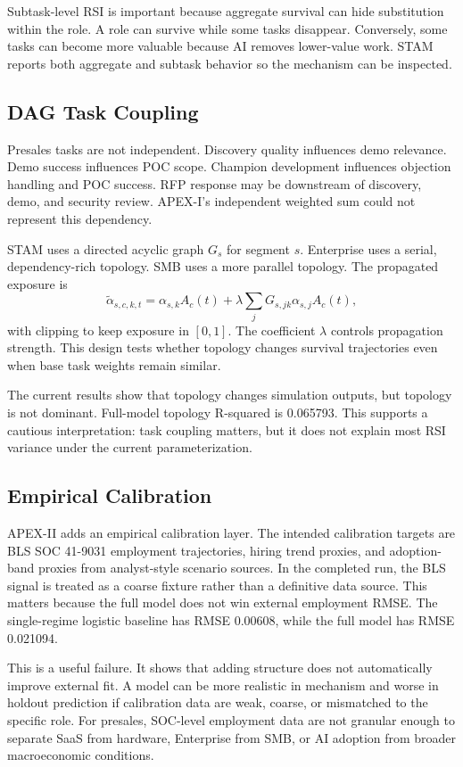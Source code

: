 \documentclass[10pt,conference]{IEEEtran}
\begin{document}
Subtask-level RSI is important because aggregate survival can hide substitution within the role. A role can survive while some tasks disappear. Conversely, some tasks can become more valuable because AI removes lower-value work. STAM reports both aggregate and subtask behavior so the mechanism can be inspected.

\subsection{DAG Task Coupling}
Presales tasks are not independent. Discovery quality influences demo relevance. Demo success influences POC scope. Champion development influences objection handling and POC success. RFP response may be downstream of discovery, demo, and security review. APEX-I's independent weighted sum could not represent this dependency.

STAM uses a directed acyclic graph $G_s$ for segment $s$. Enterprise uses a serial, dependency-rich topology. SMB uses a more parallel topology. The propagated exposure is
\begin{equation}
\tilde{\alpha}_{s,c,k,t} =
\alpha_{s,k} A_c(t) + \lambda \sum_j G_{s,jk}\alpha_{s,j} A_c(t),
\end{equation}
with clipping to keep exposure in $[0,1]$. The coefficient $\lambda$ controls propagation strength. This design tests whether topology changes survival trajectories even when base task weights remain similar.

The current results show that topology changes simulation outputs, but topology is not dominant. Full-model topology R-squared is 0.065793. This supports a cautious interpretation: task coupling matters, but it does not explain most RSI variance under the current parameterization.

\subsection{Empirical Calibration}
APEX-II adds an empirical calibration layer. The intended calibration targets are BLS SOC 41-9031 employment trajectories, hiring trend proxies, and adoption-band proxies from analyst-style scenario sources. In the completed run, the BLS signal is treated as a coarse fixture rather than a definitive data source. This matters because the full model does not win external employment RMSE. The single-regime logistic baseline has RMSE 0.00608, while the full model has RMSE 0.021094.

This is a useful failure. It shows that adding structure does not automatically improve external fit. A model can be more realistic in mechanism and worse in holdout prediction if calibration data are weak, coarse, or mismatched to the specific role. For presales, SOC-level employment data are not granular enough to separate SaaS from hardware, Enterprise from SMB, or AI adoption from broader macroeconomic conditions.
\end{document}
